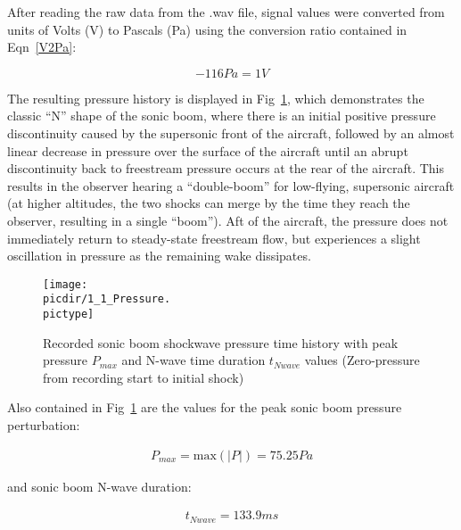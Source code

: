 \documentclass[twocolumn,10pt]{asme2ej}
\begin{document}
After reading the raw data from the .wav file, signal values were converted from units of Volts (V) to Pascals (Pa) using the conversion ratio contained in Eqn~\ref{V2Pa}:

\begin{equation} \label{V2Pa}
-116Pa = 1V
\end{equation}

The resulting pressure history is displayed in Fig~\ref{boom}, which demonstrates the classic ``N'' shape of the sonic boom, where there is an initial positive pressure discontinuity caused by the supersonic front of the aircraft, followed by an almost linear decrease in pressure over the surface of the aircraft until an abrupt discontinuity back to freestream pressure occurs at the rear of the aircraft.  This results in the observer hearing a ``double-boom'' for low-flying, supersonic aircraft (at higher altitudes, the two shocks can merge by the time they reach the observer, resulting in a single ``boom'').  Aft of the aircraft, the pressure does not immediately return to steady-state freestream flow, but experiences a slight oscillation in pressure as the remaining wake dissipates.

\vspace{-0.25em}
\begin{figure}[h]
\begin{center}
\texttt{[image: \\picdir/1\_1\_Pressure.\\pictype]}
\caption{Recorded sonic boom shockwave pressure time history with peak pressure $P_{max}$ and N-wave time duration $t_{Nwave}$ values (Zero-pressure from recording start to initial shock)}
\label{boom}
\end{center}
\end{figure}
\vspace{-2em}

\clearpage
Also contained in Fig~\ref{boom} are the values for the peak sonic boom pressure perturbation:

\vspace{-2em}
\begin{gather*}
P_{max}=\text{max}\left(|P|\right)=\boxed{75.25Pa}
\end{gather*}
\vspace{-2em}

\noindent and sonic boom N-wave duration:

\vspace{-2em}
\begin{gather*}
t_{Nwave}=\boxed{133.9ms}
\end{gather*}
\vspace{-2em}
\end{document}

